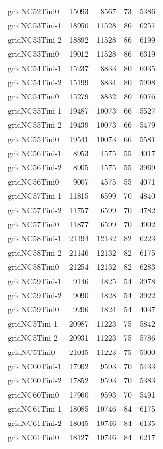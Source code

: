 \begin{longtable}{lrrrr}
gridNC52Tini0 & 15093 & 8567 & 73 & 5386 \\
gridNC53Tini-1 & 18950 & 11528 & 86 & 6257 \\
gridNC53Tini-2 & 18892 & 11528 & 86 & 6199 \\
gridNC53Tini0 & 19012 & 11528 & 86 & 6319 \\
gridNC54Tini-1 & 15237 & 8833 & 80 & 6035 \\
gridNC54Tini-2 & 15199 & 8834 & 80 & 5998 \\
gridNC54Tini0 & 15279 & 8832 & 80 & 6076 \\
gridNC55Tini-1 & 19487 & 10073 & 66 & 5527 \\
gridNC55Tini-2 & 19439 & 10073 & 66 & 5479 \\
gridNC55Tini0 & 19541 & 10073 & 66 & 5581 \\
gridNC56Tini-1 & 8953 & 4575 & 55 & 4017 \\
gridNC56Tini-2 & 8905 & 4575 & 55 & 3969 \\
gridNC56Tini0 & 9007 & 4575 & 55 & 4071 \\
gridNC57Tini-1 & 11815 & 6599 & 70 & 4840 \\
gridNC57Tini-2 & 11757 & 6599 & 70 & 4782 \\
gridNC57Tini0 & 11877 & 6599 & 70 & 4902 \\
gridNC58Tini-1 & 21194 & 12132 & 82 & 6223 \\
gridNC58Tini-2 & 21146 & 12132 & 82 & 6175 \\
gridNC58Tini0 & 21254 & 12132 & 82 & 6283 \\
gridNC59Tini-1 & 9146 & 4825 & 54 & 3978 \\
gridNC59Tini-2 & 9090 & 4828 & 54 & 3922 \\
gridNC59Tini0 & 9206 & 4824 & 54 & 4037 \\
gridNC5Tini-1 & 20987 & 11223 & 75 & 5842 \\
gridNC5Tini-2 & 20931 & 11223 & 75 & 5786 \\
gridNC5Tini0 & 21045 & 11223 & 75 & 5900 \\
gridNC60Tini-1 & 17902 & 9593 & 70 & 5433 \\
gridNC60Tini-2 & 17852 & 9593 & 70 & 5383 \\
gridNC60Tini0 & 17960 & 9593 & 70 & 5491 \\
gridNC61Tini-1 & 18085 & 10746 & 84 & 6175 \\
gridNC61Tini-2 & 18045 & 10746 & 84 & 6135 \\
gridNC61Tini0 & 18127 & 10746 & 84 & 6217 \\

\end{longtable}
